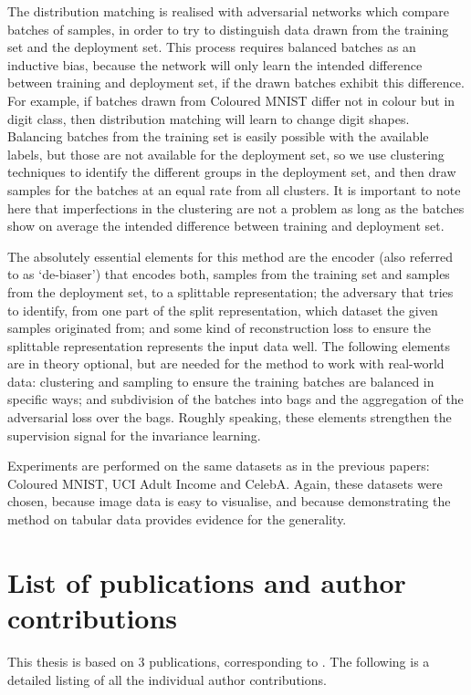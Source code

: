 The distribution matching is realised with adversarial networks which compare batches of samples,
in order to try to distinguish data drawn from the training set and the deployment set.
This process requires balanced batches as an inductive bias,
because the network will only learn the intended difference between training and deployment set,
if the drawn batches exhibit this difference.
For example, if batches drawn from Coloured MNIST differ not in colour but in digit class,
then distribution matching will learn to change digit shapes.
Balancing batches from the training set is easily possible with the available labels,
but those are not available for the deployment set,
so we use clustering techniques to identify the different groups in the deployment set,
and then draw samples for the batches at an equal rate from all clusters.
It is important to note here that imperfections in the clustering are not a problem
as long as the batches show on average the intended difference between training and deployment set.

The absolutely essential elements for this method are the encoder (also referred to as `de-biaser')
that encodes both, samples from the training set and samples from the deployment set,
to a splittable representation;
the adversary that tries to identify, from one part of the split representation,
which dataset the given samples originated from;
and some kind of reconstruction loss
to ensure the splittable representation represents the input data well.
The following elements are in theory optional,
but are needed for the method to work with real-world data:
clustering and sampling to ensure the training batches are balanced in specific ways;
and subdivision of the batches into bags and the aggregation of the adversarial loss over the bags.
Roughly speaking, these elements strengthen the supervision signal for the invariance learning.

Experiments are performed on the same datasets as in the previous papers:
Coloured MNIST, UCI Adult Income and CelebA.
Again, these datasets were chosen, because image data is easy to visualise,
and because demonstrating the method on tabular data provides evidence for the generality.

\section{List of publications and author contributions}%
\label{sec:claims-contributions}
This thesis is based on 3 publications, corresponding to .
The following is a detailed listing of all the individual author contributions.

